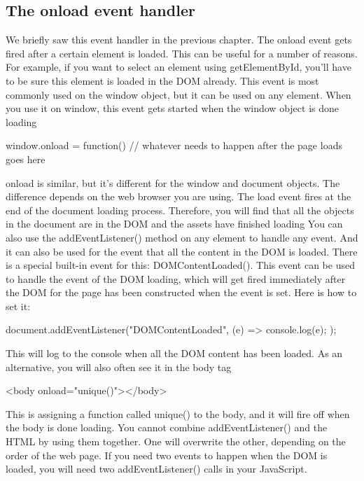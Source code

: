 \documentclass{report}
\begin{document}
\begin{jscode}
\subsection{The onload event handler}
\bigbreak \noindent 
We briefly saw this event handler in the previous chapter. The onload event gets
fired after a certain element is loaded. This can be useful for a number of reasons. For
example, if you want to select an element using getElementById, you'll have to be
sure this element is loaded in the DOM already. This event is most commonly used
on the window object, but it can be used on any element. When you use it on window,
this event gets started when the window object is done loading
\bigbreak \noindent 
\begin{jscode}
    window.onload = function() {
        // whatever needs to happen after the page loads goes here
    }
\end{jscode}
\bigbreak \noindent 
onload is similar, but it's different for the window and document objects. The
difference depends on the web browser you are using. The load event fires at the
end of the document loading process. Therefore, you will find that all the objects
in the document are in the DOM and the assets have finished loading
\bigbreak \noindent 
You can also use the addEventListener() method on any element to handle any
event. And it can also be used for the event that all the content in the DOM is loaded.
There is a special built-in event for this: DOMContentLoaded(). This event can be used
to handle the event of the DOM loading, which will get fired immediately after the
DOM for the page has been constructed when the event is set. Here is how to set it:
\bigbreak \noindent 
\begin{jscode}
    document.addEventListener("DOMContentLoaded", (e) => {
        console.log(e);
    });
\end{jscode}
\bigbreak \noindent 
This will log to the console when all the DOM content has been loaded. As an
alternative, you will also often see it in the body tag
\bigbreak \noindent 
\begin{jscode}
<body onload="unique()"></body>
\end{jscode}
\bigbreak \noindent 
This is assigning a function called unique() to the body, and it will fire off when
the body is done loading. You cannot combine addEventListener() and the HTML
by using them together. One will overwrite the other, depending on the order of
the web page. If you need two events to happen when the DOM is loaded, you will
need two addEventListener() calls in your JavaScript.
\bigbreak \noindent 

\end{jscode}
\end{document}
